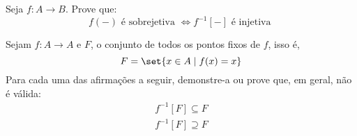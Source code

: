 \begin{exercise}
    Seja $f : A \to B$. Prove que: $$f(-) \text{ é sobrejetiva } \iff f^{-1}[-] \text{ é injetiva } $$
\end{exercise}

\begin{exercise}
    Sejam $f: A \to A$ e $F$, o conjunto de todos os pontos fixos de $f$, isso é, $$F = \set{x \in A \mid f(x)=x}$$
    Para cada uma das afirmações a seguir, demonstre-a ou prove que, em geral, não é válida:
    \begin{gather*}
        f^{-1}[F] \subseteq F\\
        f^{-1}[F] \supseteq F
    \end{gather*}
    
\end{exercise}